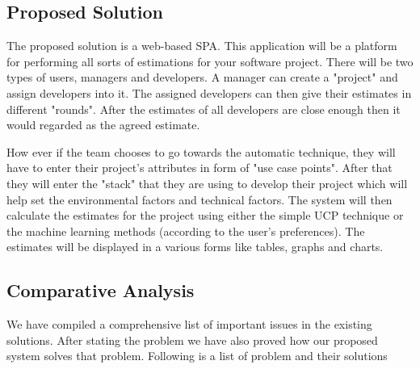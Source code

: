 \subsection{Proposed Solution}
The proposed solution is a web-based SPA. This application will be a platform for performing all sorts of estimations for your software project. There will be two types of users, managers and developers. A manager can create a "project" and assign developers into it. The assigned developers can then give their estimates in different "rounds". After the estimates of all developers are close enough then it would regarded as the agreed estimate.

How ever if the team chooses to go towards the automatic technique, they will have to enter their project's attributes in form of "use case points". After that they will enter the "stack" that they are using to develop their project which will help set the environmental factors and technical factors. The system will then calculate the estimates for the project using either the simple UCP technique or the machine learning methods (according to the user's preferences). The estimates will be displayed in a various forms like tables, graphs and charts.


\subsection{Comparative Analysis}
We have compiled a comprehensive list of important issues in the existing solutions. After stating the problem we have also proved how our proposed system solves that problem. Following is a list of problem and their solutions

